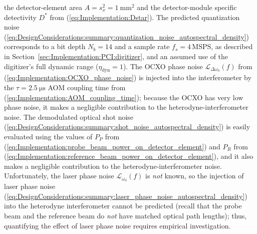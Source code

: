 the detector-element area $A = s_x^2 = \SI{1}{\milli\meter\squared}$ and
the detector-module specific detectivity $D^*$ from
(\ref{eq:Implementation:Dstar}).
The predicted quantization noise
(\ref{eq:DesignConsiderations:summary:quantization_noise_autospectral_density})
corresponds to a bit depth $N_b = 14$ and
a sample rate $f_s = 4 \, \text{MSPS}$,
as described in Section~\ref{sec:Implementation:PCI:digitizer}, and
an assumed use of the digitizer's full dynamic range
($\eta_{\text{dyn}} = 1$).
The OCXO phase noise $\mathcal{L}_{\Delta \omega_0}(f)$ from
(\ref{eq:Implementation:OCXO_phase_noise})
is injected into the interferometer by the
$\tau = \SI{2.5}{\micro\second}$ AOM coupling time from
(\ref{eq:Implementation:AOM_coupling_time});
because the OCXO has very low phase noise,
it makes a negligible contribution to the heterodyne-interferometer noise.
The demodulated optical shot noise
(\ref{eq:DesignConsiderations:summary:shot_noise_autospectral_density})
is easily evaluated using the values of
$P_P$ from (\ref{eq:Implementation:probe_beam_power_on_detector_element}) and
$P_R$ from (\ref{eq:Implementation:reference_beam_power_on_detector_element}),
and it also makes a negligible contribution
to the heterodyne-interferometer noise.
Unfortunately, the laser phase noise $\mathcal{L}_{\omega_0}(f)$
is \emph{not} known, so
the injection of laser phase noise
(\ref{eq:DesignConsiderations:summary:laser_phase_noise_autospectral_density})
into the heterodyne interferometer cannot be predicted
(recall that the probe beam and the reference beam
do \emph{not} have matched optical path lengths);
thus, quantifying the effect of laser phase noise
requires empirical investigation.

